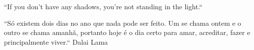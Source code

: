 

``If you don't have any shadows, you're not standing in the light.``

\begin{commentA} \vspace{0.3cm} \noindent
“Só existem dois dias no ano que nada pode ser feito.
Um se chama ontem e o outro se chama amanhã, portanto
hoje é o dia certo para amar, acreditar, fazer e principalmente
viver.“
\hfill \faHamsa Dalai Lama
 \par \vspace{0.1cm} \end{commentA}